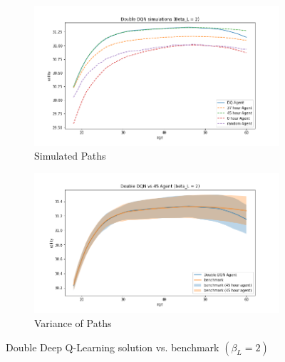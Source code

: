 \begin{figure}[ht]
\begin{subfigure}{.5\textwidth}
  \centering
  \includegraphics[width=1\linewidth]{figures/ddqn_model1_beta_2_solution_benchmark_paths.png}
  \caption{Simulated Paths}
  \label{fig:ddqn_solution_beta2_path}
\end{subfigure}%
\begin{subfigure}{.5\textwidth}
  \centering
  \includegraphics[width=1\linewidth]{figures/ddqn_model1_beta_2_solution_benchmark_variance.png}
  \caption{Variance of Paths}
  \label{fig:ddqn_solution_beta2_var}
\end{subfigure}
    \caption{Double Deep Q-Learning solution vs. benchmark $(\beta_L = 2)$}
    \label{fig:ddqn_solution_beta2}
\end{figure}

